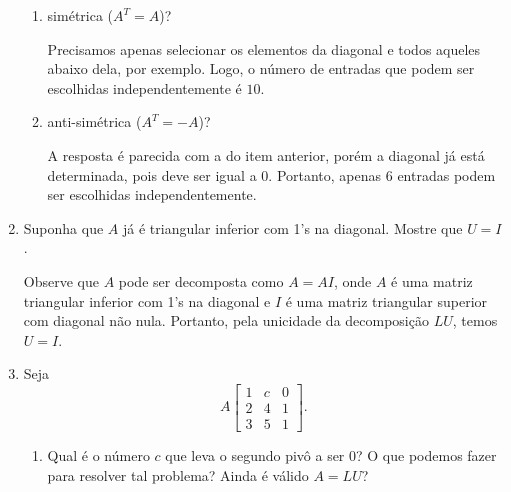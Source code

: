 \documentclass[leqno]{article}
\numberwithin{equation}{section}
\begin{document}
\begin{enumerate}
            \begin{enumerate}

                \item simétrica ($A^T = A$)?

                    \begin{sol} 
                        Precisamos apenas selecionar os elementos da diagonal e todos aqueles abaixo dela, por exemplo.
                        Logo, o número de entradas que podem ser escolhidas independentemente é \( 10 \).
                    \end{sol} 

                \item anti-simétrica ($A^T = -A$)?

                    \begin{sol} 
                        A resposta é parecida com a do item anterior, porém a diagonal já está determinada, pois deve ser igual a \( 0 \).
                        Portanto, apenas \( 6 \) entradas podem ser escolhidas independentemente.
                    \end{sol} 

            \end{enumerate}

        \item Suponha que $A$ já é triangular inferior com 1's na diagonal. Mostre que $U = I$.

            \begin{sol} 
                Observe que \( A \) pode ser decomposta como \( A = A I \), onde \( A \) é uma matriz triangular inferior com 1's na diagonal e \( I \) é uma matriz triangular superior com diagonal não nula.
                Portanto, pela unicidade da decomposição \( LU \), temos \( U = I \).
            \end{sol} 

        \item Seja 
            $$
            A 
            \begin{bmatrix}
                1 & c & 0  \\
                2 & 4 & 1  \\
                3 & 5 & 1 
            \end{bmatrix}.
            $$

            \begin{enumerate}

                \item Qual é o número $c$ que leva o segundo pivô a ser 0? O que podemos fazer para resolver tal problema? Ainda é válido $A = LU$?


\end{enumerate}
\end{enumerate}
\end{document}
